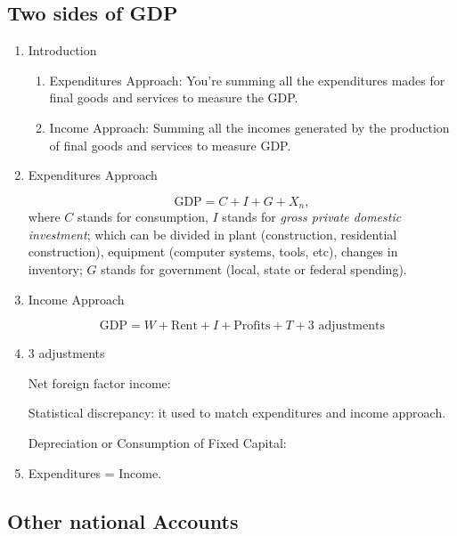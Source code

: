 \subsection{Two sides of GDP}

\begin{enumerate}
	\item Introduction
	\begin{enumerate}
		\item Expenditures Approach: You're summing all the expenditures mades for final goods and services to measure the GDP.

		\item Income Approach: Summing all the incomes generated by the production of final goods and services to measure GDP.
	\end{enumerate}

\item Expenditures Approach

	\[
		\text{GDP} = C + I + G + X_n,
	\]
	where $C$ stands for consumption, $I$ stands for \emph{gross private domestic investment}; which can be divided in plant (construction, residential construction), equipment (computer systems, tools, etc), changes in inventory; $G$ stands for government (local, state or federal spending).

\item Income Approach

	\[
		\text{GDP} = W + \text{Rent} + I + \text{Profits} + T + \text{3 adjustments}
	\]

\item 3 adjustments

	Net foreign factor income: 

	Statistical discrepancy: it used to match expenditures and income approach.

	Depreciation or Consumption of Fixed Capital:

\item Expenditures = Income.
\end{enumerate}

\subsection{Other national Accounts}

